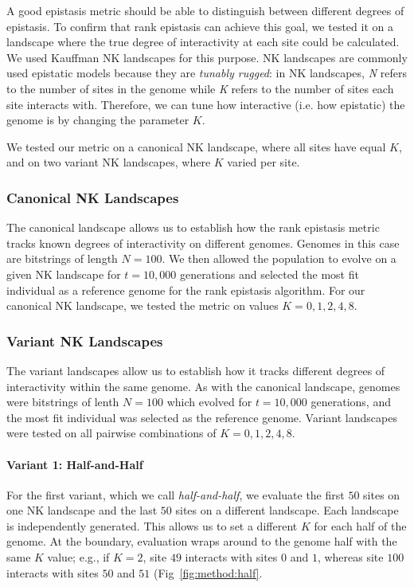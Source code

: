 A good epistasis metric should be able to distinguish between different degrees of epistasis. To confirm that rank epistasis can achieve this goal, we tested it on a landscape where the true degree of interactivity at each site could be calculated.
We used Kauffman NK landscapes \citep{kauffman_towards_1987} for this purpose.
NK landscapes are commonly used epistatic models because they are \textit{tunably rugged}: in NK landscapes, \textit{N} refers to the number of sites in the genome while \textit{K} refers to the number of sites each site interacts with.
Therefore, we can tune how interactive (i.e. how epistatic) the genome is by changing the parameter $K$. 

We tested our metric on a canonical NK landscape, where all sites have equal $K$, and on two variant NK landscapes, where $K$ varied per site. 

\subsubsection{Canonical NK Landscapes}

The canonical landscape allows us to establish how the rank epistasis metric tracks known degrees of interactivity on different genomes.
Genomes in this case are bitstrings of length $N=100$.
We then allowed the population to evolve on a given NK landscape for $t=10,000$ generations and selected the most fit individual as a reference genome for the rank epistasis algorithm. 
For our canonical NK landscape, we tested the metric on values $K=0, 1, 2, 4, 8$. 

\subsubsection{Variant NK Landscapes}

The variant landscapes allow us to establish how it tracks different degrees of interactivity within the same genome.
As with the canonical landscape, genomes were bitstrings of lenth $N=100$ which evolved for $t=10,000$ generations, and the most fit individual was selected as the reference genome.
Variant landscapes were tested on all pairwise combinations of $K=0, 1, 2, 4, 8$. 

\paragraph{Variant 1: Half-and-Half}
For the first variant, which we call \textit{half-and-half}, we evaluate the first $50$ sites on one NK landscape and the last $50$ sites on a different landscape. Each landscape is independently generated. This allows us to set a different $K$ for each half of the genome. At the boundary, evaluation wraps around to the genome half with the same $K$ value; e.g., if $K=2$, site $49$ interacts with sites $0$ and $1$, whereas site $100$ interacts with sites $50$ and $51$ (Fig~\ref{fig:method:half}.

